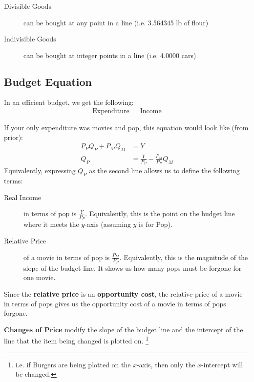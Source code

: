                     \begin{description}
                        \item[Divisible Goods] can be bought at any point in a line (i.e. 3.564345 lb of flour)
                        \item[Indivisible Goods] can be bought at integer points in a line (i.e. 4.0000 cars)
                    \end{description}
                \subsection{Budget Equation} %
                \label{sub:budget_equation}
                    In an efficient budget, we get the following:
                    \begin{align*}
                        \text{Expenditure} &= \text{Income}
                    \end{align*}

                    If your only expenditure was movies and pop, this equation would look like (from prior):
                    \begin{align*}
                        P_P Q_P + P_M Q_M &= Y \\
                        Q_P &= \frac{Y}{P_P} - \frac{P_M}{P_P}Q_M
                    \end{align*}
                    Equivalently, expressing $Q_P$ as the second line allows us to define the following terms:
                    \begin{description}
                        \item[Real Income] in terms of pop is $\frac{Y}{P_P}$.
                            Equivalently, this is the point on the budget line where it meets the $y$-axis (assuming $y$ is for Pop).
                        \item[Relative Price] of a movie in terms of pop is $\frac{P_M}{P_P}$.
                            Equivalently, this is the magnitude of the slope of the budget line.
                            It shows us how many pops must be forgone for one movie.
                    \end{description}
                    Since the \textbf{relative price} is an \textbf{opportunity cost}, the relative price of a movie in terms of pops gives us the opportunity cost of a movie in terms of pops forgone.

                    \textbf{Changes of Price} modify the slope of the budget line and the intercept of the line that the item being changed is plotted on.
                    \footnote{i.e. if Burgers are being plotted on the $x$-axis, then only the $x$-intercept will be changed.}

